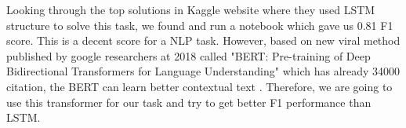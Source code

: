 \documentclass[12pt]{extarticle}
\begin{document}
Looking through the top solutions in Kaggle website where they used LSTM structure to solve this task, we found and run a notebook which gave us 0.81 F1 score. This is a decent score for a NLP task. However, based on new viral method published by google researchers at 2018 called "BERT: Pre-training of Deep Bidirectional Transformers for Language Understanding" which has already 34000 citation, the BERT can learn better contextual text \cite{devlin2018bert}. Therefore, we are going to use this transformer for our task and try to get better F1 performance than LSTM.


 
 

\end{document}
